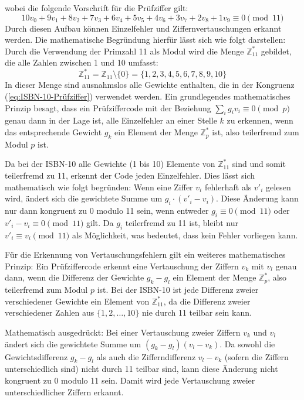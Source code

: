 wobei die folgende Vorschrift für die Prüfziffer gilt: \newline
\begin{equation}
\label{eq:ISBN-10-Prüfziffer}
        10v_0 + 9v_1 + 8v_2 + 7v_3 + 6v_4 + 5v_5 + 4v_6 + 3v_7 + 2v_8 + 1v_9 \equiv 0 \pmod{11}
\end{equation}
Durch diesen Aufbau können Einzelfehler und Ziffernvertauschungen erkannt werden. Die mathematische Begründung hierfür lässt sich wie folgt darstellen: Durch die Verwendung der Primzahl 11 als Modul wird die Menge $\mathbb{Z}^*_{11}$ gebildet, die alle Zahlen zwischen 1 und 10 umfasst:
\begin{equation}
\mathbb{Z}^*_{11} = \mathbb{Z}_{11} \setminus \{0\} = \{1, 2, 3, 4, 5, 6, 7, 8, 9, 10\}
\end{equation}
In dieser Menge sind ausnahmslos alle Gewichte enthalten, die in der Kongruenz (\ref{eq:ISBN-10-Prüfziffer}) verwendet werden. Ein grundlegendes mathematisches Prinzip besagt, dass ein Prüfziffercode mit der Beziehung $\sum_i g_i v_i \equiv 0 \pmod{p}$ genau dann in der Lage ist, alle Einzelfehler an einer Stelle $k$ zu erkennen, wenn das entsprechende Gewicht $g_k$ ein Element der Menge $\mathbb{Z}^*_p$ ist, also teilerfremd zum Modul $p$ ist.

Da bei der ISBN-10 alle Gewichte (1 bis 10) Elemente von $\mathbb{Z}^*_{11}$ sind und somit teilerfremd zu 11, erkennt der Code jeden Einzelfehler. Dies lässt sich mathematisch wie folgt begründen: Wenn eine Ziffer $v_i$ fehlerhaft als $v'_i$ gelesen wird, ändert sich die gewichtete Summe um $g_i \cdot (v'_i - v_i)$. Diese Änderung kann nur dann kongruent zu 0 modulo 11 sein, wenn entweder $g_i \equiv 0 \pmod{11}$ oder $v'_i - v_i \equiv 0 \pmod{11}$ gilt. Da $g_i$ teilerfremd zu 11 ist, bleibt nur $v'_i \equiv v_i \pmod{11}$ als Möglichkeit, was bedeutet, dass kein Fehler vorliegen kann.

Für die Erkennung von Vertauschungsfehlern gilt ein weiteres mathematisches Prinzip: Ein Prüfziffercode erkennt eine Vertauschung der Ziffern $v_k$ mit $v_l$ genau dann, wenn die Differenz der Gewichte $g_k - g_l$ ein Element der Menge $\mathbb{Z}^*_p$, also teilerfremd zum Modul $p$ ist. Bei der ISBN-10 ist jede Differenz zweier verschiedener Gewichte ein Element von $\mathbb{Z}^*_{11}$, da die Differenz zweier verschiedener Zahlen aus $\{1,2,\ldots,10\}$ nie durch 11 teilbar sein kann.

Mathematisch ausgedrückt: Bei einer Vertauschung zweier Ziffern $v_k$ und $v_l$ ändert sich die gewichtete Summe um $(g_k - g_l)(v_l - v_k)$. Da sowohl die Gewichtsdifferenz $g_k - g_l$ als auch die Zifferndifferenz $v_l - v_k$ (sofern die Ziffern unterschiedlich sind) nicht durch 11 teilbar sind, kann diese Änderung nicht kongruent zu 0 modulo 11 sein. Damit wird jede Vertauschung zweier unterschiedlicher Ziffern erkannt.

